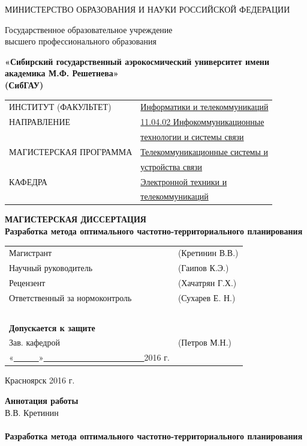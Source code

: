 \documentclass[14pt,a4paper,titlepage]{extarticle}
\newcommand\dissername{Разработка метода оптимального частотно-территориального планирования}
\begin{document}
\begin{titlepage}
\centering
МИНИСТЕРСТВО ОБРАЗОВАНИЯ И НАУКИ РОССИЙСКОЙ ФЕДЕРАЦИИ

Государственное образовательное учреждение \\ высшего профессионального образования

\textbf{«Сибирский государственный аэрокосмический университет
имени академика М.Ф. Решетнева» \\ (СибГАУ)}

\vfill

\begin{tabular}{p{}l}
ИНСТИТУТ (ФАКУЛЬТЕТ) & \underline{Информатики и телекоммуникаций}\\
НАПРАВЛЕНИЕ & \underline{11.04.02 Инфокоммуникационные }\\
~ & \underline{технологии и системы связи}\\
МАГИСТЕРСКАЯ ПРОГРАММА & \underline{Телекоммуникационные системы и}\\ 
~ & \underline{устройства связи}\\
КАФЕДРА & \underline{Электронной техники и }\\
~ & \underline{телекоммуникаций}\\
\end{tabular}

\vfill

\textbf{МАГИСТЕРСКАЯ ДИССЕРТАЦИЯ}  \\
\textbf{\dissername}

\vfill

\begin{tabular}{p{}p{}}
{\Large\strut}Магистрант & (Кретинин В.В.)\\
{\Large\strut}Научный руководитель & (Гаипов К.Э.)\\
{\Large\strut}Рецензент &  (Хачатрян Г.Х.)\\
{\Large\strut}Ответственный за нормоконтроль &  (Сухарев Е. Н.)\\
~ & ~ \\
\textbf{Допускается к защите} & ~ \\
{\Large\strut}Зав. кафедрой & (Петров М.Н.) \\
{\Large\strut}«\underline{~~~~~~}»\underline{~~~~~~~~~~~~~~~~~~~~~~~~}2016 г.
\end{tabular}

\vfill
Красноярск 2016 г.
\end{titlepage}
\begin{center}
\textbf{Аннотация работы} \\
В.В. Кретинин \\
~\\
\textbf{\dissername}
\end{center}
\end{document}
